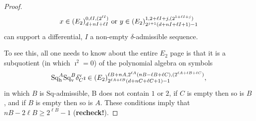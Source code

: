 \documentclass[11pt]{amsart}
\theoremstyle{plain}
\theoremstyle{definition}
\theoremstyle{plain}
\newcommand{\Sq}{\mathrm{Sq}}
\newcommand{\Sqh}{\mathrm{Sq}_\textup{h}}
\newcommand{\Sqv}{\mathrm{Sq}_\textup{v}}
\begin{document}
\begin{Calculations of HW0}
\begin{proof}
%
%
%
%
\[x\in (E_2)^{0,\ell I,(2^{\ell I})}_{d+nI+\ell I}\textup{ or }y\in (E_2)^{1,2+\ell I+j,(2^{1+\ell I+j})}_{2^{j+1}(d+nI+\ell I+1)-1}\]
can support a differential, $I$ a non-empty $\delta$-admissible sequence.

To see this, all one needs to know about the entire $E_2$ page is that it is a subquotient (in which $\imath^2=0$) of the polynomial algebra on symbols
\[\Sqh^A\Sqv^B\delta_C^\textup{v}\imath\in (E_2)^{\ell B+nA,2^{\ell A}(nB-\ell B+\ell C),(2^{\ell A+\ell B+\ell C})}_{2^{\ell A+\ell B}(d+nC+\ell C+1)-1},\]
in which $B$ is $\Sq$-admissible, B does not contain $1$ or $2$, if $C$ is empty then so is $B$, and if $B$ is empty then so is $A$. These conditions imply that $nB-2\ell B\geq2^{\ell B}-1$ (\textbf{recheck!}). %


\end{proof}
\end{Calculations of HW0}
\end{document}
